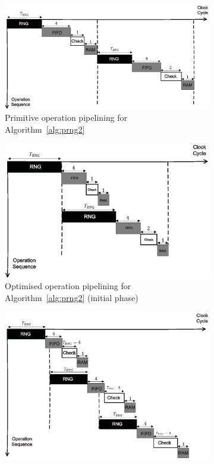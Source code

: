 \documentclass[runningheads]{llncs}
\begin{document}
\begin{figure}[!tb]
\centering
\begin{subfigure}[t]{0.45\textwidth}\centering
\includegraphics[width=\textwidth]{./fig/pipeline_rng.eps}
\caption{Primitive operation pipelining for Algorithm~\ref{alg:prng2}}
\label{fig:pipeline_rng}
\end{subfigure}
\hspace{1em}
\begin{subfigure}[t]{0.45\textwidth}\centering
\includegraphics[width=\textwidth]{./fig/pipeline_rng2.eps}
\caption{Optimised operation pipelining for Algorithm~\ref{alg:prng2} (initial phase) }
\label{fig:pipeline_rng2}
\end{subfigure}
\begin{subfigure}[t]{0.45\textwidth}\centering
\includegraphics[width=\textwidth]{./fig/pipeline_rng3.eps}

\end{subfigure}
\end{figure}
\end{document}
